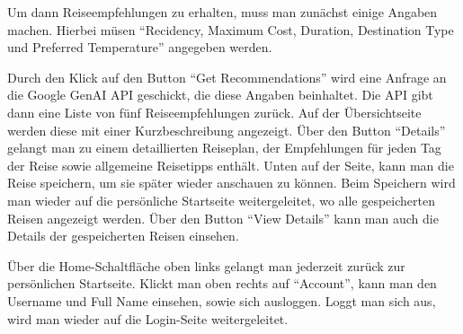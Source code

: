 Um dann Reiseempfehlungen zu erhalten, muss man zunächst einige Angaben machen. Hierbei müsen \enquote{Recidency, Maximum Cost, Duration, Destination Type und Preferred Temperature} angegeben werden.

Durch den Klick auf den Button \enquote{Get Recommendations} wird eine Anfrage an die Google GenAI API geschickt, die diese Angaben beinhaltet. Die API gibt dann eine Liste von fünf Reiseempfehlungen zurück. Auf der Übersichtseite werden diese mit einer Kurzbeschreibung angezeigt. Über den Button \enquote{Details} gelangt man zu einem detaillierten Reiseplan, der Empfehlungen für jeden Tag der Reise sowie allgemeine Reisetipps enthält. Unten auf der Seite, kann man die Reise speichern, um sie später wieder anschauen zu können. Beim Speichern wird man wieder auf die persönliche Startseite weitergeleitet, wo alle gespeicherten Reisen angezeigt werden.
Über den Button \enquote{View Details} kann man auch die Details der gespeicherten Reisen einsehen.

Über die Home-Schaltfläche oben links gelangt man jederzeit zurück zur persönlichen Startseite. Klickt man oben rechts auf \enquote{Account}, kann man den Username und Full Name einsehen, sowie sich ausloggen. Loggt man sich aus, wird man wieder auf die Login-Seite weitergeleitet.
 
